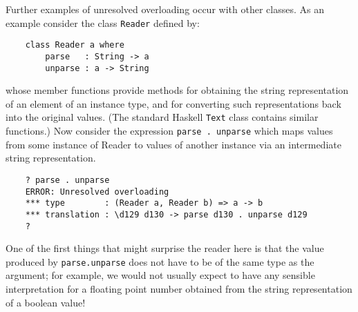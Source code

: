 Further examples of unresolved overloading occur  with  other  classes.
As an example consider the class \verb"Reader" defined by:
\begin{verbatim}
    class Reader a where 
        parse   : String -> a   
        unparse : a -> String
\end{verbatim}
whose  member  functions  provide  methods  for  obtaining  the  string
representation of an element of an instance type,  and  for  converting
such representations  back  into  the  original  values.  (The  standard
Haskell \verb"Text" class  contains  similar  functions.)   Now  consider  the
expression \verb"parse . unparse" which maps values from  some  instance  of
Reader to  values  of  another  instance  via  an  intermediate  string
representation.
\begin{verbatim}
    ? parse . unparse
    ERROR: Unresolved overloading
    *** type        : (Reader a, Reader b) => a -> b
    *** translation : \d129 d130 -> parse d130 . unparse d129
    ?
\end{verbatim}
One of the first things that might surprise the reader here is that the
value produced by \verb"parse.unparse" does not have to  be  of  the  same
type as the argument; for example, we would not usually expect to  have
any sensible interpretation for a floating point number  obtained  from
the string representation of a boolean value!

